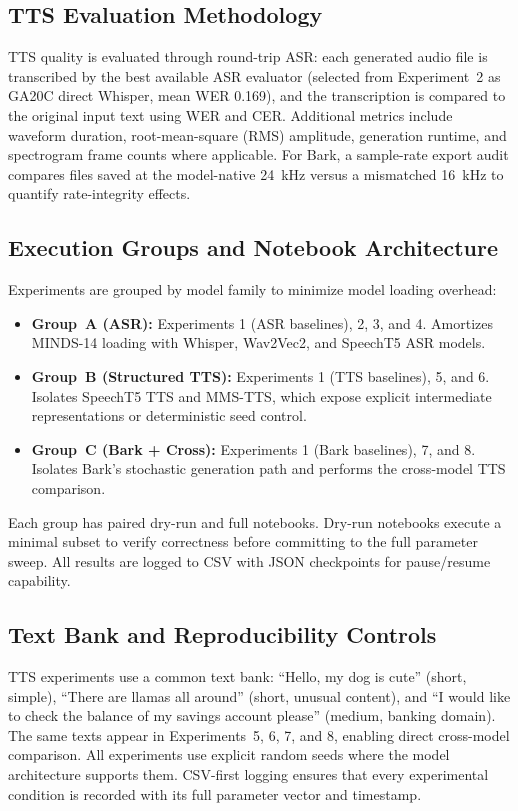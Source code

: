 \documentclass[conference]{IEEEtran}
\begin{document}
\subsection{TTS Evaluation Methodology}

TTS quality is evaluated through round-trip ASR: each generated audio file is transcribed by the best available ASR evaluator (selected from Experiment~2 as GA20C direct Whisper, mean WER 0.169), and the transcription is compared to the original input text using WER and CER. Additional metrics include waveform duration, root-mean-square (RMS) amplitude, generation runtime, and spectrogram frame counts where applicable. For Bark, a sample-rate export audit compares files saved at the model-native 24~kHz versus a mismatched 16~kHz to quantify rate-integrity effects.

\subsection{Execution Groups and Notebook Architecture}

Experiments are grouped by model family to minimize model loading overhead:

\begin{itemize}
    \item \textbf{Group~A (ASR):} Experiments 1 (ASR baselines), 2, 3, and 4. Amortizes MINDS-14 loading with Whisper, Wav2Vec2, and SpeechT5 ASR models.
    \item \textbf{Group~B (Structured TTS):} Experiments 1 (TTS baselines), 5, and 6. Isolates SpeechT5 TTS and MMS-TTS, which expose explicit intermediate representations or deterministic seed control.
    \item \textbf{Group~C (Bark + Cross):} Experiments 1 (Bark baselines), 7, and 8. Isolates Bark's stochastic generation path and performs the cross-model TTS comparison.
\end{itemize}

Each group has paired dry-run and full notebooks. Dry-run notebooks execute a minimal subset to verify correctness before committing to the full parameter sweep. All results are logged to CSV with JSON checkpoints for pause/resume capability.

\subsection{Text Bank and Reproducibility Controls}

TTS experiments use a common text bank: ``Hello, my dog is cute'' (short, simple), ``There are llamas all around'' (short, unusual content), and ``I would like to check the balance of my savings account please'' (medium, banking domain). The same texts appear in Experiments~5, 6, 7, and 8, enabling direct cross-model comparison. All experiments use explicit random seeds where the model architecture supports them. CSV-first logging ensures that every experimental condition is recorded with its full parameter vector and timestamp.
\end{document}
